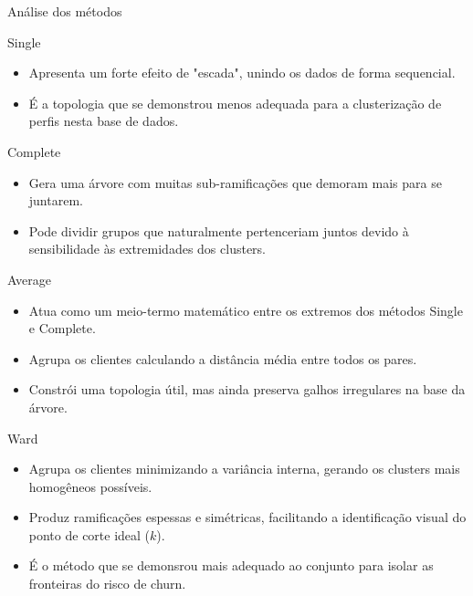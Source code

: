 \documentclass[10pt]{beamer}
\begin{document}
\begin{frame}[shrink=10]{Análise dos métodos}
    \begin{block}{Single}
        \begin{itemize}
            \item Apresenta um forte efeito de "escada", unindo os dados de forma sequencial.
            \item É a topologia que se demonstrou menos adequada para a clusterização de perfis nesta base de dados.
        \end{itemize}
    \end{block}

    \begin{block}{Complete}
        \begin{itemize}
            \item Gera uma árvore com muitas sub-ramificações que demoram mais para se juntarem.
            \item Pode dividir grupos que naturalmente pertenceriam juntos devido à sensibilidade às extremidades dos clusters.
        \end{itemize}
    \end{block}

    \begin{block}{Average}
        \begin{itemize}
            \item Atua como um meio-termo matemático entre os extremos dos métodos Single e Complete.
            \item Agrupa os clientes calculando a distância média entre todos os pares.
            \item Constrói uma topologia útil, mas ainda preserva galhos irregulares na base da árvore.
        \end{itemize}
    \end{block}

    \begin{block}{Ward}
        \begin{itemize}
            \item Agrupa os clientes minimizando a variância interna, gerando os clusters mais homogêneos possíveis.
            \item Produz ramificações espessas e simétricas, facilitando a identificação visual do ponto de corte ideal ($k$).
            \item É o método que se demonsrou mais adequado ao conjunto para isolar as fronteiras do risco de churn.
        \end{itemize}
    \end{block}

\end{frame}
   
\end{document}
